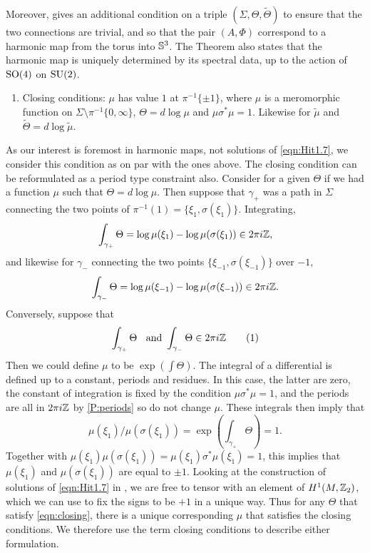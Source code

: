 \documentclass{article}
\begin{document}
Moreover, \cite[Theorem~8.20]{Hitchin1990} gives an additional condition on a triple $(\Sigma,\Theta,\tilde{\Theta})$ to ensure that the two connections are trivial, and so that the pair $(A,\Phi)$ correspond to a harmonic map from the torus into $\S^3$. The Theorem also states that the harmonic map is uniquely determined by its spectral data, up to the action of $\SO(4)$ on $\SU(2)$.
\begin{enumerate}[resume*]
\item\label{P:closing} Closing conditions: $\mu$ has value $1$ at $\pi^{-1}\{\pm 1\}$, where $\mu$ is a meromorphic function on $\Sigma\setminus \pi^{-1}\{0,\infty\}$, $\Theta = d\log \mu$ and $\mu\sigma^*\mu = 1$. Likewise for $\tilde{\mu}$ and $\tilde{\Theta}=d\log \tilde{\mu}$.
\end{enumerate}
As our interest is foremost in harmonic maps, not solutions of \eqref{eqn:Hit1.7}, we consider this condition as on par with the ones above. The closing condition can be reformulated as a period type constraint also. Consider for a given $\Theta$ if we had a function $\mu$ such that $\Theta = d\log \mu$. Then suppose that $\gamma_+$ was a path in $\Sigma$ connecting the two points of $\pi^{-1}(1) = \{\xi_1, \sigma(\xi_1)\}$. Integrating,
\[
\int_{\gamma_+} \Theta = \log \mu(\xi_{1}) - \log \mu(\sigma(\xi_{1})) \in 2\pi\iu\Z,
\]
and likewise for $\gamma_-$ connecting the two points $\{\xi_{-1}, \sigma(\xi_{-1})\}$ over $-1$,
\[
\int_{\gamma_-} \Theta = \log \mu(\xi_{-1}) - \log \mu(\sigma(\xi_{-1})) \in 2\pi\iu\Z.
\]
Conversely, suppose that
\[
\int_{\gamma_+} \Theta \;\;\text{ and } \int_{\gamma_-} \Theta \in 2\pi\iu\Z \labelthis{eqn:closing}
\]
Then we could define $\mu$ to be $\exp(\int \Theta)$. The integral of a differential is defined up to a constant, periods and residues. In this case, the latter are zero, the constant of integration is fixed by the condition $\mu\sigma^*\mu = 1$, and the periods are all in $2\pi\iu\Z$ by \ref{P:periods} so do not change $\mu$. These integrals then imply that
\[
\mu(\xi_1)/\mu(\sigma(\xi_1)) = \exp \left(\int_{\gamma_+} \Theta \right) = 1.
\]
Together with $\mu(\xi_1)\mu(\sigma(\xi_1)) = \mu(\xi_1)\sigma^*\mu(\xi_1) = 1$, this implies that $\mu(\xi_1)$ and $\mu(\sigma(\xi_1))$ are equal to $\pm 1$. Looking at the construction of solutions of \eqref{eqn:Hit1.7} in \cite[Section~8]{Hitchin1990}, we are free to tensor with an element of $H^1(M,\Z_2)$, which we can use to fix the signs to be $+1$ in a unique way. Thus for any $\Theta$ that satisfy \eqref{eqn:closing}, there is a unique corresponding $\mu$ that satisfies the closing conditions. We therefore use the term closing conditions to describe either formulation.
\end{document}
